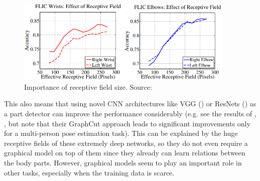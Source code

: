 \documentclass[a4paper,10pt]{article}
\begin{document}
    \begin{figure}[H]
    	\includegraphics[height=4cm]{img/receptive_field_importance.png}
    	\caption{Importance of receptive field size. Source: \cite{conv_pose_machines}}
    	\label{rec_field}
    \end{figure}
    This also means that using novel CNN architectures like VGG (\cite{vgg}) or ResNets (\cite{resnets}) as a part detector can improve the performance considerably (e.g. see the results of \cite{deepcut}, \cite{deepercut}, but note that their GraphCut approach leads to significant improvements only for a multi-person pose estimation task). This can be explained by the huge receptive fields of these extremely deep networks, so they do not even require a graphical model on top of them since they already can learn relations between the body parts. However, graphical models seem to play an important role in other tasks, especially when the training data is scarce.
    
    
 
 
	\newpage
	\renewcommand{\thepage}{}
	
	
	\newpage
	
	
\end{document}
